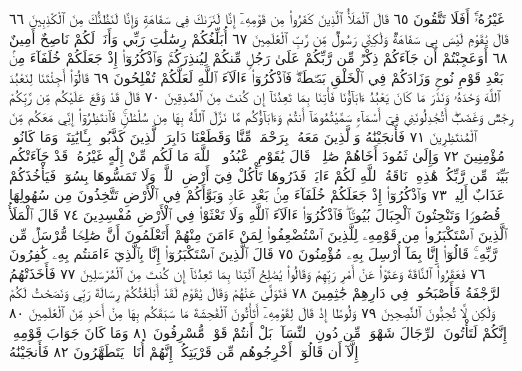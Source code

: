 غَيْرُهُۥٓۚ أَفَلَا تَتَّقُونَ ٦٥ قَالَ ٱلْمَلَأُ ٱلَّذِينَ كَفَرُوا۟ مِن قَوْمِهِۦٓ
إِنَّا لَنَرَىٰكَ فِي سَفَاهَةࣲ وَإِنَّا لَنَظُنُّكَ مِنَ ٱلْكَٰذِبِينَ ٦٦
قَالَ يَٰقَوْمِ لَيْسَ بِي سَفَاهَةࣱ وَلَٰكِنِّي رَسُولࣱ مِّن رَّبِّ ٱلْعَٰلَمِينَ ٦٧
أُبَلِّغُكُمْ رِسَٰلَٰتِ رَبِّي وَأَنَا۠ لَكُمْ نَاصِحٌ أَمِينٌ ٦٨ أَوَعَجِبْتُمْ أَن
جَآءَكُمْ ذِكْرࣱ مِّن رَّبِّكُمْ عَلَىٰ رَجُلࣲ مِّنكُمْ لِيُنذِرَكُمْۚ
وَٱذْكُرُوٓا۟ إِذْ جَعَلَكُمْ خُلَفَآءَ مِنۢ بَعْدِ قَوْمِ نُوحࣲ وَزَادَكُمْ
فِي ٱلْخَلْقِ بَصْۜطَةࣰۖ فَٱذْكُرُوٓا۟ ءَالَآءَ ٱللَّهِ لَعَلَّكُمْ تُفْلِحُونَ ٦٩
قَالُوٓا۟ أَجِئْتَنَا لِنَعْبُدَ ٱللَّهَ وَحْدَهُۥ وَنَذَرَ مَا كَانَ يَعْبُدُ
ءَابَآؤُنَا فَأْتِنَا بِمَا تَعِدُنَآ إِن كُنتَ مِنَ ٱلصَّٰدِقِينَ ٧٠
قَالَ قَدْ وَقَعَ عَلَيْكُم مِّن رَّبِّكُمْ رِجْسࣱ وَغَضَبٌۖ
أَتُجَٰدِلُونَنِي فِيٓ أَسْمَآءࣲ سَمَّيْتُمُوهَآ أَنتُمْ وَءَابَآؤُكُم
مَّا نَزَّلَ ٱللَّهُ بِهَا مِن سُلْطَٰنࣲۚ فَٱنتَظِرُوٓا۟ إِنِّي مَعَكُم مِّنَ
ٱلْمُنتَظِرِينَ ٧١ فَأَنجَيْنَٰهُ وَٱلَّذِينَ مَعَهُۥ بِرَحْمَةࣲ مِّنَّا
وَقَطَعْنَا دَابِرَ ٱلَّذِينَ كَذَّبُوا۟ بِـَٔايَٰتِنَاۖ وَمَا كَانُوا۟ مُؤْمِنِينَ ٧٢
وَإِلَىٰ ثَمُودَ أَخَاهُمْ صَٰلِحࣰاۚ قَالَ يَٰقَوْمِ ٱعْبُدُوا۟ ٱللَّهَ
مَا لَكُم مِّنْ إِلَٰهٍ غَيْرُهُۥۖ قَدْ جَآءَتْكُم بَيِّنَةࣱ مِّن رَّبِّكُمْۖ
هَٰذِهِۦ نَاقَةُ ٱللَّهِ لَكُمْ ءَايَةࣰۖ فَذَرُوهَا تَأْكُلْ فِيٓ أَرْضِ
ٱللَّهِۖ وَلَا تَمَسُّوهَا بِسُوٓءࣲ فَيَأْخُذَكُمْ عَذَابٌ أَلِيمࣱ ٧٣
وَٱذْكُرُوٓا۟ إِذْ جَعَلَكُمْ خُلَفَآءَ مِنۢ بَعْدِ عَادࣲ وَبَوَّأَكُمْ
فِي ٱلْأَرْضِ تَتَّخِذُونَ مِن سُهُولِهَا قُصُورࣰا وَتَنْحِتُونَ
ٱلْجِبَالَ بُيُوتࣰاۖ فَٱذْكُرُوٓا۟ ءَالَآءَ ٱللَّهِ وَلَا تَعْثَوْا۟ فِي
ٱلْأَرْضِ مُفْسِدِينَ ٧٤ قَالَ ٱلْمَلَأُ ٱلَّذِينَ ٱسْتَكْبَرُوا۟ مِن
قَوْمِهِۦ لِلَّذِينَ ٱسْتُضْعِفُوا۟ لِمَنْ ءَامَنَ مِنْهُمْ أَتَعْلَمُونَ
أَنَّ صَٰلِحࣰا مُّرْسَلࣱ مِّن رَّبِّهِۦۚ قَالُوٓا۟ إِنَّا بِمَآ أُرْسِلَ بِهِۦ
مُؤْمِنُونَ ٧٥ قَالَ ٱلَّذِينَ ٱسْتَكْبَرُوٓا۟ إِنَّا بِٱلَّذِيٓ
ءَامَنتُم بِهِۦ كَٰفِرُونَ ٧٦ فَعَقَرُوا۟ ٱلنَّاقَةَ وَعَتَوْا۟ عَنْ
أَمْرِ رَبِّهِمْ وَقَالُوا۟ يَٰصَٰلِحُ ٱئْتِنَا بِمَا تَعِدُنَآ إِن كُنتَ
مِنَ ٱلْمُرْسَلِينَ ٧٧ فَأَخَذَتْهُمُ ٱلرَّجْفَةُ فَأَصْبَحُوا۟ فِي دَارِهِمْ
جَٰثِمِينَ ٧٨ فَتَوَلَّىٰ عَنْهُمْ وَقَالَ يَٰقَوْمِ لَقَدْ أَبْلَغْتُكُمْ
رِسَالَةَ رَبِّي وَنَصَحْتُ لَكُمْ وَلَٰكِن لَّا تُحِبُّونَ ٱلنَّٰصِحِينَ ٧٩
وَلُوطًا إِذْ قَالَ لِقَوْمِهِۦٓ أَتَأْتُونَ ٱلْفَٰحِشَةَ مَا سَبَقَكُم
بِهَا مِنْ أَحَدࣲ مِّنَ ٱلْعَٰلَمِينَ ٨٠ إِنَّكُمْ لَتَأْتُونَ ٱلرِّجَالَ
شَهْوَةࣰ مِّن دُونِ ٱلنِّسَآءِۚ بَلْ أَنتُمْ قَوْمࣱ مُّسْرِفُونَ ٨١
وَمَا كَانَ جَوَابَ قَوْمِهِۦٓ إِلَّآ أَن قَالُوٓا۟ أَخْرِجُوهُم مِّن
قَرْيَتِكُمْۖ إِنَّهُمْ أُنَاسࣱ يَتَطَهَّرُونَ ٨٢ فَأَنجَيْنَٰهُ
